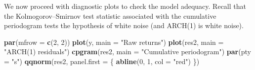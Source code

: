 \documentclass[]{book}
\newenvironment{Shaded}{\begin{snugshade}}{\end{snugshade}}
\newcommand{\ControlFlowTok}[1]{\textcolor[rgb]{0.13,0.29,0.53}{\textbf{#1}}}
\newcommand{\DataTypeTok}[1]{\textcolor[rgb]{0.13,0.29,0.53}{#1}}
\newcommand{\DecValTok}[1]{\textcolor[rgb]{0.00,0.00,0.81}{#1}}
\newcommand{\KeywordTok}[1]{\textcolor[rgb]{0.13,0.29,0.53}{\textbf{#1}}}
\newcommand{\NormalTok}[1]{#1}
\newcommand{\OperatorTok}[1]{\textcolor[rgb]{0.81,0.36,0.00}{\textbf{#1}}}
\newcommand{\StringTok}[1]{\textcolor[rgb]{0.31,0.60,0.02}{#1}}
\begin{document}
\begin{Shaded}
\end{Shaded}

We now proceed with diagnostic plots to check the model adequacy. Recall
that the Kolmogorov--Smirnov test statistic associated with the
cumulative periodogram tests the hypothesis of white noise (and ARCH(1)
is white noise).

\begin{Shaded}
\begin{Highlighting}[]
\KeywordTok{par}\NormalTok{(}\DataTypeTok{mfrow =} \KeywordTok{c}\NormalTok{(}\DecValTok{2}\NormalTok{, }\DecValTok{2}\NormalTok{))}
\KeywordTok{plot}\NormalTok{(y, }\DataTypeTok{main =} \StringTok{"Raw returns"}\NormalTok{)}
\KeywordTok{plot}\NormalTok{(res2, }\DataTypeTok{main =} \StringTok{"ARCH(1) residuals"}\NormalTok{)}
\KeywordTok{cpgram}\NormalTok{(res2, }\DataTypeTok{main =} \StringTok{"Cumulative periodogram"}\NormalTok{)}
\KeywordTok{par}\NormalTok{(}\DataTypeTok{pty =} \StringTok{"s"}\NormalTok{)}
\KeywordTok{qqnorm}\NormalTok{(res2, }\DataTypeTok{panel.first =}\NormalTok{ \{}
    \KeywordTok{abline}\NormalTok{(}\DecValTok{0}\NormalTok{, }\DecValTok{1}\NormalTok{, }\DataTypeTok{col =} \StringTok{"red"}\NormalTok{)}
\NormalTok{\})}
\end{Highlighting}
\end{Shaded}
\end{document}
